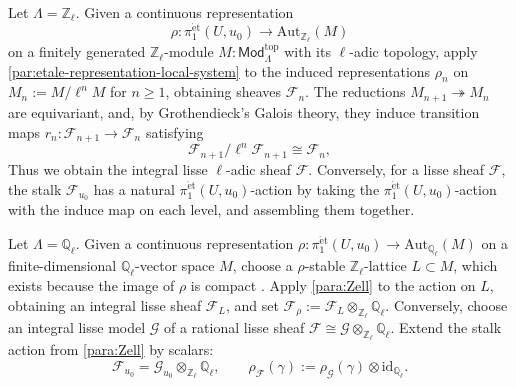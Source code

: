 \documentclass[11pt,letterpaper]{article}
\theoremstyle{numberfirstplain}
\numberwithin{equation}{theorem}
\theoremstyle{numberfirstupright}
\begin{document}
Let $\Lambda=\mathbb Z_\ell$. 
Given a continuous representation 
$$\rho:\pi_1^{\mathrm{\acute{e}t}}(U,u_0)\rightarrow\mathrm{Aut}_{\mathbb Z_\ell}(M)$$ on a finitely generated $\mathbb Z_\ell$-module $M:\mathsf{Mod}_{\Lambda}^{\mathrm{top}}$ with its $\ell$-adic topology, apply \cref{par:etale-representation-local-system} to the induced representations $\rho_n$ on $M_n:=M/\ell^nM$ for $n\ge1$, obtaining sheaves $\mathcal F_n$. 
The reductions $M_{n+1}\twoheadrightarrow M_n$ are equivariant, and, by Grothendieck's Galois theory, they induce transition maps $r_n:\mathcal F_{n+1}\rightarrow\mathcal F_n$ satisfying
$$\mathcal F_{n+1}/\ell^n\mathcal F_{n+1}\cong\mathcal F_n,$$
Thus we obtain the integral lisse $\ell$-adic sheaf $\mathcal F$. 
Conversely, for a lisse sheaf $\mathcal F$, the stalk $\mathcal F_{u_0}$ has a natural $\pi_1^{\mathrm{\acute{e}t}}(U,u_0)$-action by taking the $\pi_1^{\mathrm{\acute{e}t}}(U,u_0)$-action with the induce map on each level, and assembling them together. 

Let $\Lambda=\mathbb Q_\ell$. 
Given a continuous representation $\rho:\pi_1^{\mathrm{\acute{e}t}}(U,u_0)\rightarrow\mathrm{Aut}_{\mathbb Q_\ell}(M)$ on a finite-dimensional $\mathbb Q_\ell$-vector space $M$, choose a $\rho$-stable $\mathbb Z_\ell$-lattice $L\subset M$, which exists because the image of $\rho$ is compact \cite[Part~II, Ch.~IV, Appendix~1, Theorem~1]{Serre1992Lie}. Apply \cref{para:Zell} to the action on $L$, obtaining an integral lisse sheaf $\mathcal F_L$, and set $\mathcal F_\rho:=\mathcal F_L\otimes_{\mathbb Z_\ell}\mathbb Q_\ell$.
Conversely, choose an integral lisse model $\mathcal G$ of a rational lisse sheaf $\mathcal F\cong\mathcal G\otimes_{\mathbb Z_\ell}\mathbb Q_\ell$. Extend the stalk action from \cref{para:Zell} by scalars:
$$\mathcal F_{u_0}=\mathcal G_{u_0}\otimes_{\mathbb Z_\ell}\mathbb Q_\ell,\qquad \rho_{\mathcal F}(\gamma):=\rho_{\mathcal G}(\gamma)\otimes\mathrm{id}_{\mathbb Q_\ell}.$$
\end{document}
